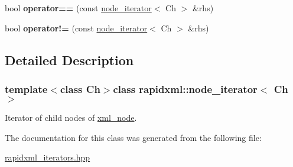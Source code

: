 \begin{DoxyCompactItemize}
\item 
\hypertarget{classrapidxml_1_1node__iterator_a5cb8a3b0d65a1a2517995e986a4debfd}{bool {\bfseries operator==} (const \hyperlink{classrapidxml_1_1node__iterator}{node\-\_\-iterator}$<$ Ch $>$ \&rhs)}\label{classrapidxml_1_1node__iterator_a5cb8a3b0d65a1a2517995e986a4debfd}

\item 
\hypertarget{classrapidxml_1_1node__iterator_a20f1e25347d7e3856694f18597f7c8e2}{bool {\bfseries operator!=} (const \hyperlink{classrapidxml_1_1node__iterator}{node\-\_\-iterator}$<$ Ch $>$ \&rhs)}\label{classrapidxml_1_1node__iterator_a20f1e25347d7e3856694f18597f7c8e2}

\end{DoxyCompactItemize}


\subsection{Detailed Description}
\subsubsection*{template$<$class Ch$>$class rapidxml\-::node\-\_\-iterator$<$ Ch $>$}

Iterator of child nodes of \hyperlink{classrapidxml_1_1xml__node}{xml\-\_\-node}. 

The documentation for this class was generated from the following file\-:\begin{DoxyCompactItemize}
\item 
\hyperlink{rapidxml__iterators_8hpp}{rapidxml\-\_\-iterators.\-hpp}\end{DoxyCompactItemize}
